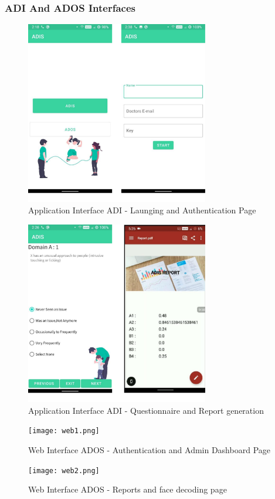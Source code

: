 \subsubsection{ADI And ADOS Interfaces}
\begin{figure}[h]
\label{ss}
\centering
\includegraphics[width= 8cm]{app1.png}
\caption{Application Interface ADI - Launging and Authentication Page}
\end{figure}
\begin{figure}[h]
\label{ss}
\centering
\includegraphics[width= 8cm]{app2.png}
\caption{Application Interface ADI - Questionnaire and Report generation}
\end{figure}
\begin{figure}[h]
\label{ss}
\centering
\texttt{[image: web1.png]}
\caption{Web Interface ADOS - Authentication and Admin Dashboard Page}
\end{figure}

\begin{figure}[h]
\label{ss}
\centering
\texttt{[image: web2.png]}
\caption{Web Interface ADOS - Reports and face decoding page}
\end{figure}

